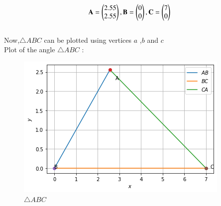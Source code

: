 \documentclass[journal,12pt,twocolumn]{IEEEtran}
\begin{document}
\begin{align}
\mathbf{A}=\begin{pmatrix}2.55\\2.55\end{pmatrix},\mathbf{B}=\begin{pmatrix}0\\0\end{pmatrix},\mathbf{C} =\begin{pmatrix}7\\0\end{pmatrix}
\end{align}
\\
Now,$\triangle ABC$ can be plotted using vertices $a$ ,$b$ and $c$
\\
Plot of the angle $\triangle ABC$ :
\begin{figure}[!ht]
\centering
\includegraphics[width=\columnwidth]{figure.png}
\caption{$\triangle ABC$}
\label{fig:$\triangle ABC$}
\end{figure}    
\end{document}
